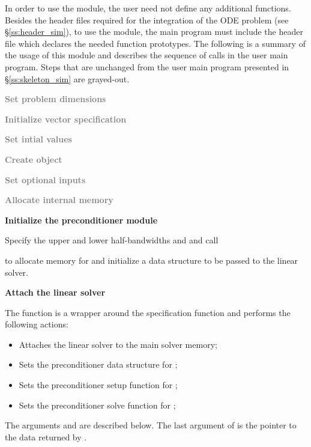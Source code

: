 In order to use the {\cvbandpre} module, the user need not define any
additional functions. 
Besides the header files required for the integration of the ODE problem
(see \S\ref{ss:header_sim}),  to use the {\cvbandpre} module, the main program 
must include the header file  which declares the needed
function prototypes.
The following is a summary of the usage of this module and describes the sequence 
of calls in the user main program. Steps that are unchanged from the user main
program presented in \S\ref{ss:skeleton_sim} are grayed-out.
\begin{Steps}
  
\item
  \textcolor{gray}{\bf Set problem dimensions}

\item
  \textcolor{gray}{\bf Initialize vector specification}

\item
  \textcolor{gray}{\bf Set intial values}
 
\item
  \textcolor{gray}{\bf Create {\cvodes} object}

\item
  \textcolor{gray}{\bf Set optional inputs}

\item
  \textcolor{gray}{\bf Allocate internal memory}

\item \label{i:bandpre_init}
  {\bf Initialize the {\cvbandpre} preconditioner module}

  Specify the upper and lower half-bandwidths  and  and call 


  to allocate memory for and initialize a data structure  to be 
  passed to the {\cvspgmr} linear solver.

\item \label{i:bandpre_attach}
  {\bf Attach the {\cvspgmr} linear solver}


  The function  is a wrapper around the {\cvspgmr} specification
  function  and performs the following actions:
  \begin{itemize}
    \item Attaches the {\cvspgmr} linear solver to the main {\cvodes} solver memory;
    \item Sets the preconditioner data structure for {\cvbandpre};
    \item Sets the preconditioner setup function for {\cvbandpre};
    \item Sets the preconditioner solve function for {\cvbandpre};
  \end{itemize}
  The arguments  and  are described below.
  The last argument of  is the pointer to the {\cvbandpre} data
  returned by .


\end{Steps}
